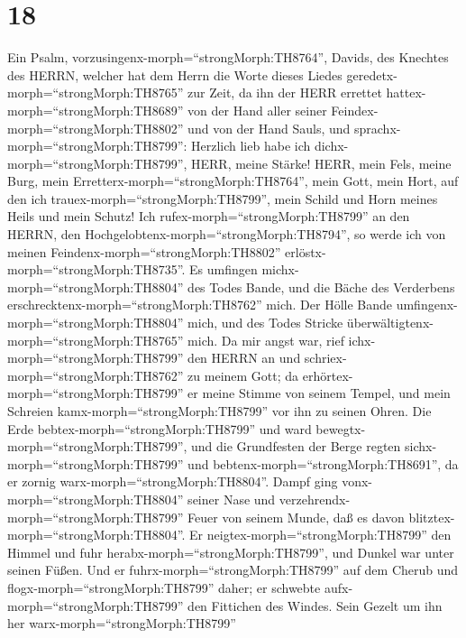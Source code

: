 \hypertarget{section-17}{%
\section{18}\label{section-17}}

 Ein Psalm, vorzusingenx-morph=``strongMorph:TH8764'',
Davids, des Knechtes des HERRN, welcher hat dem Herrn die Worte dieses
Liedes geredetx-morph=``strongMorph:TH8765'' zur Zeit, da ihn der HERR
errettet hattex-morph=``strongMorph:TH8689'' von der Hand aller seiner
Feindex-morph=``strongMorph:TH8802'' und von der Hand Sauls, und
sprachx-morph=``strongMorph:TH8799'': Herzlich lieb habe ich
dichx-morph=``strongMorph:TH8799'', HERR, meine Stärke! 
HERR, mein Fels, meine Burg, mein
Erretterx-morph=``strongMorph:TH8764'', mein Gott, mein Hort, auf den
ich trauex-morph=``strongMorph:TH8799'', mein Schild und Horn meines
Heils und mein Schutz!  Ich
rufex-morph=``strongMorph:TH8799'' an den HERRN, den
Hochgelobtenx-morph=``strongMorph:TH8794'', so werde ich von meinen
Feindenx-morph=``strongMorph:TH8802''
erlöstx-morph=``strongMorph:TH8735''.  Es umfingen
michx-morph=``strongMorph:TH8804'' des Todes Bande, und die Bäche des
Verderbens erschrecktenx-morph=``strongMorph:TH8762'' mich. 
Der Hölle Bande umfingenx-morph=``strongMorph:TH8804'' mich, und des
Todes Stricke überwältigtenx-morph=``strongMorph:TH8765'' mich.
 Da mir angst war, rief ichx-morph=``strongMorph:TH8799''
den HERRN an und schriex-morph=``strongMorph:TH8762'' zu meinem Gott; da
erhörtex-morph=``strongMorph:TH8799'' er meine Stimme von seinem Tempel,
und mein Schreien kamx-morph=``strongMorph:TH8799'' vor ihn zu seinen
Ohren.  Die Erde bebtex-morph=``strongMorph:TH8799'' und
ward bewegtx-morph=``strongMorph:TH8799'', und die Grundfesten der Berge
regten sichx-morph=``strongMorph:TH8799'' und
bebtenx-morph=``strongMorph:TH8691'', da er zornig
warx-morph=``strongMorph:TH8804''.  Dampf ging
vonx-morph=``strongMorph:TH8804'' seiner Nase und
verzehrendx-morph=``strongMorph:TH8799'' Feuer von seinem Munde, daß es
davon blitztex-morph=``strongMorph:TH8804''.  Er
neigtex-morph=``strongMorph:TH8799'' den Himmel und fuhr
herabx-morph=``strongMorph:TH8799'', und Dunkel war unter seinen Füßen.
 Und er fuhrx-morph=``strongMorph:TH8799'' auf dem Cherub
und flogx-morph=``strongMorph:TH8799'' daher; er schwebte
aufx-morph=``strongMorph:TH8799'' den Fittichen des Windes.
 Sein Gezelt um ihn her warx-morph=``strongMorph:TH8799''
